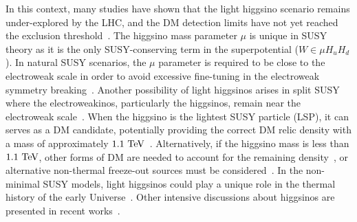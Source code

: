 \documentclass[letterpaper,11pt]{article}
\begin{document}
\par In this context, many studies have shown that the light higgsino scenario remains under-explored by the LHC, and the DM detection limits have not yet reached the exclusion threshold~\cite{Martin:2024ytt, Martin:2024pxx}. 
The higgsino mass parameter $\mu$ is unique in SUSY theory as it is the only SUSY-conserving term in the superpotential ($W \in \mu H_u H_d $).
In natural SUSY scenarios, the $\mu$ parameter is required to be close to the electroweak scale in order to avoid excessive fine-tuning in the electroweak symmetry breaking~\cite{Feng:2013pwa, vanBeekveld:2019tqp, Barbieri:1987fn, Arvanitaki:2013yja, Evans:2013jna, Baer:2014ica}. 
Another possibility of light higgsinos arises in split SUSY where the electroweakinos, particularly the higgsinos, remain near the electroweak scale~\cite{Wells:2003tf, Arkani-Hamed:2004zhs, Wells:2004di, Arvanitaki:2012ps}. When the higgsino is the lightest SUSY particle (LSP), it can serves as a DM candidate, potentially providing the correct DM relic density with a mass of approximately $1.1~{\rm TeV}$~\cite{Delgado:2020url, Fox:2014moa, Chattopadhyay:2005mv, Chakraborti:2014fha, Shafi:2023sqa, Mummidi:2018myd}. Alternatively, if the higgsino mass is less than $1.1~{\rm TeV}$, other forms of DM are needed to account for the remaining density~\cite{Baer:2025srs}, or alternative non-thermal freeze-out sources must be considered~\cite{Han:2019vxi, Kowalska:2014hza, Aparicio:2016qqb, SuryanarayanaMummidi:2020ydm}. In the non-minimal SUSY models, light higgsinos could play a unique role in the thermal history of the early Universe~\cite{Cao:2018rix, Cao:2019qng, Cao:2019evo, Cao:2021lmj, Cao:2021tuh, Yue:2025dqe, Liang:2025utb, Dong:2024juh, Wang:2024ozr, Chakraborti:2024pdn, Dai:2023pli, Khan:2025yit}. Other intensive discussions about higgsinos are presented in recent works~\cite{Araz:2025bww, Zhou:2025xol, Carpenter:2023agq, Baer:2025zqt, Baer:2024hqm, Nagata:2025ycf, Baer:2024tfo, Fowlie:2024nhs, Li:2023hey, VanBeekveld:2021tgn, Baer:2020sgm, Bae:2019dgg, Baer:2017pba, Wang:2016otm, Fan:2024jvz, Du:2023qvj, Wang:2023bmh, Li:2022zap, Wang:2022rfd, Wang:2018idz, Khan:2025azf, Yin:2024bwv, Fu:2023sfk, Agin:2024yfs, Rodd:2024qsi, Liu:2020muv, Liu:2020ctf, Zhao:2022pnv}. 
\end{document}
